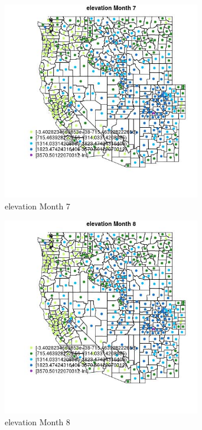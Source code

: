 \begin{figure} 
\centering  
\includegraphics[width=0.77\textwidth]{Code_Outputs/df_report_ML_predictors_CountyCentroid_Locations_Dates_2008-01-01to2018-12-31_MapObsMo7elevation.jpg} 
\caption{\label{fig:df_report_ML_predictors_CountyCentroid_Locations_Dates_2008-01-01to2018-12-31MapObsMo7elevation}elevation Month 7} 
\end{figure} 
 

\begin{figure} 
\centering  
\includegraphics[width=0.77\textwidth]{Code_Outputs/df_report_ML_predictors_CountyCentroid_Locations_Dates_2008-01-01to2018-12-31_MapObsMo8elevation.jpg} 
\caption{\label{fig:df_report_ML_predictors_CountyCentroid_Locations_Dates_2008-01-01to2018-12-31MapObsMo8elevation}elevation Month 8} 
\end{figure} 
 

